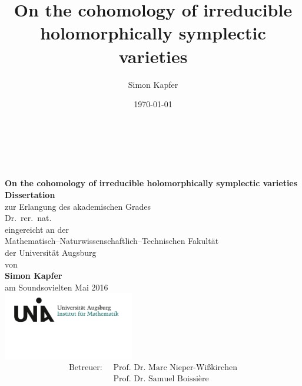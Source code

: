 \documentclass[letterpaper]{amsart}
\begin{document}
\title{
\bf On the cohomology of irreducible holomorphically symplectic varieties
}


\author{Simon Kapfer}


\date{\today}
\thispagestyle{empty}
\begin{center}
\ \\
\ \\
\ \\
\textbf{ \LARGE On the cohomology of irreducible holomorphically symplectic varieties}
\\
\vspace{1cm}
\Large \textbf{Dissertation} \\
\Large 
\vspace{0.5cm}
\textnormal\large zur Erlangung des akademischen Grades \\
\vspace{5mm}
Dr.~rer.~nat. \\
\vspace{1cm}
eingereicht an der \\
Mathematisch--Naturwissenschaftlich--Technischen Fakult\"at\\
der Universit\"at Augsburg
\\ \vspace{1cm}
von \\
\textbf{Simon Kapfer}\\
\vspace{8mm}
am Soundsovielten Mai 2016 \\
\vspace{15mm}
\includegraphics[height=30mm]{LogoInstitut.png}
\vspace{-10mm}
\begin{align*}
\text{Betreuer: }\ 
& \text{Prof.~Dr.~Marc Nieper-Wi\ss kirchen}\\
& \text{Prof.~Dr.~Samuel Boissi\`ere}
\end{align*}
\end{center}
\pagebreak
\end{document}

